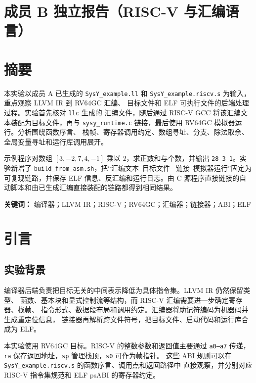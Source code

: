 \documentclass[a4paper]{article}
\begin{document}
\clearpage
\section*{成员 B 独立报告（RISC-V 与汇编语言）}

\section{摘要}

本实验以成员 A 已生成的 \texttt{SysY\_example.ll} 和
\texttt{SysY\_example.riscv.s} 为输入，重点观察 LLVM IR 到 RV64GC 汇编、
目标文件和 ELF 可执行文件的后端处理过程。实验首先核对 \texttt{llc} 生成的
汇编文件，随后通过 RISC-V GCC 将该汇编文本装配为目标文件，再与
\texttt{sysy\_runtime.c} 链接，最后使用 RV64GC 模拟器运行。分析围绕函数序言、
栈帧、寄存器调用约定、数组寻址、分支、除法取余、全局变量寻址和运行库调用展开。

示例程序对数组 $[3,-2,7,4,-1]$ 乘以 $2$，求正数和与个数，并输出
\texttt{28 3 1}。实验新增了 \texttt{build\_from\_asm.sh}，把“汇编文本--目标文件--
链接--模拟器运行”固定为可复现链路，并保存 ELF 信息、反汇编和运行日志。由 C
源程序直接链接的自动脚本和由已生成汇编直接装配的链路都得到相同结果。

\noindent\textbf{关键词：} 编译器；LLVM IR；RISC-V；RV64GC；汇编器；链接器；ABI；ELF

\section{引言}

\subsection{实验背景}

编译器后端负责把目标无关的中间表示降低为具体指令集。LLVM IR 仍然保留类型、
函数、基本块和显式控制流等结构，而 RISC-V 汇编需要进一步确定寄存器、栈帧、
指令形式、数据段布局和调用约定。汇编器将助记符编码为机器码并生成重定位信息，
链接器再解析跨文件符号，把目标文件、启动代码和运行库合成为 ELF。

本实验使用 RV64GC 目标。RISC-V 的整数参数和返回值主要通过 \texttt{a0--a7}
传递，\texttt{ra} 保存返回地址，\texttt{sp} 管理栈顶，\texttt{s0} 可作为帧指针。
这些 ABI 规则可以在 \texttt{SysY\_example.riscv.s} 的函数序言、调用点和返回路径中
直接观察，并分别对应 RISC-V 指令集规范和 ELF psABI 的寄存器约定\cite{riscvIsa,riscvPsabi}。
\end{document}
